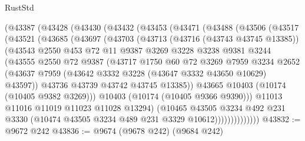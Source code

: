\begin{lexlean}{RustStd}
\begin{coremodule}
    (@43387
      (@43428
        (@43430
          (@43432
            (@43453
              (@43471
                (@43488
                  (@43506
                    (@43517
                      (@43521
                        (@43685
                          (@43697
                            (@43703
                              (@43713
                                (@43716 (@43743 @43745 @13385))
                                (@43543
                                  @2550
                                  @453
                                  @72
                                  @11
                                  @9387
                                  @3269
                                  @3228
                                  @3238
                                  @9381
                                  @3244
                                  (@43555
                                    @2550
                                    @72
                                    @9387
                                    (@43717
                                      @1750
                                      @60
                                      @72
                                      @3269
                                      @7959
                                      @3234
                                      @2652
                                      (@43637
                                        @7959
                                        (@43642 @3332 @3228 (@43647 @3332 @43650 @10629) @43597))
                                      @43736
                                      @43739
                                      @43742
                                      @43745
                                      @13385))
                                  @43665
                                  @10403
                                  (@10174 (@10405 @9382 @3269)))
                                @10403
                                (@10174 (@10405 @9366 @9390)))
                              @11013
                              @11016
                              @11019
                              @11023
                              @11028
                              @13294)
                            (@10465
                              @43505
                              @3234
                              @492
                              @231
                              @3330
                              (@10474 @43505 @3234 @489 @231 @3329 @10612))))))))))))))
@43832 := @9672 @242
@43836 := @9674 (@9678 @242) (@9684 @242)

\end{coremodule}
\end{lexlean}
